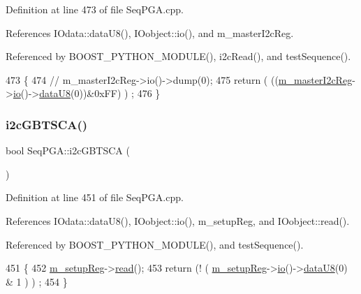 Definition at line 473 of file Seq\+P\+G\+A.\+cpp.



References I\+Odata\+::data\+U8(), I\+Oobject\+::io(), and m\+\_\+master\+I2c\+Reg.



Referenced by B\+O\+O\+S\+T\+\_\+\+P\+Y\+T\+H\+O\+N\+\_\+\+M\+O\+D\+U\+L\+E(), i2c\+Read(), and test\+Sequence().


\begin{DoxyCode}
473                                  \{
474   \textcolor{comment}{//  m\_masterI2cReg->io()->dump(0);}
475   \textcolor{keywordflow}{return} ( ((\hyperlink{classSeqPGA_a942c71b33a4f43b7a994cb9216abb17e}{m\_masterI2cReg}->\hyperlink{classIOobject_af04fb94137c3d86849f478ac5afab5d1}{io}()->\hyperlink{classIOdata_a75e9c318dbac3a39402179070943d4bc}{dataU8}(0))&0xFF) ) ;
476 \}
\end{DoxyCode}
\mbox{\label{classSeqPGA_a1d9edf6e3303581efe0bdb1b8b3fff0c}} 
\subsubsection{\texorpdfstring{i2c\+G\+B\+T\+S\+C\+A()}{i2cGBTSCA()}}
{\footnotesize\ttfamily bool Seq\+P\+G\+A\+::i2c\+G\+B\+T\+S\+CA (\begin{DoxyParamCaption}{ }\end{DoxyParamCaption})}



Definition at line 451 of file Seq\+P\+G\+A.\+cpp.



References I\+Odata\+::data\+U8(), I\+Oobject\+::io(), m\+\_\+setup\+Reg, and I\+Oobject\+::read().



Referenced by B\+O\+O\+S\+T\+\_\+\+P\+Y\+T\+H\+O\+N\+\_\+\+M\+O\+D\+U\+L\+E(), and test\+Sequence().


\begin{DoxyCode}
451                        \{
452   \hyperlink{classSeqPGA_a03269241e7fc26493cd0595beda334c2}{m\_setupReg}->\hyperlink{classIOobject_aa07610c11963b1db6710e3c76ceea456}{read}();
453   \textcolor{keywordflow}{return} (! ( \hyperlink{classSeqPGA_a03269241e7fc26493cd0595beda334c2}{m\_setupReg}->\hyperlink{classIOobject_af04fb94137c3d86849f478ac5afab5d1}{io}()->\hyperlink{classIOdata_a75e9c318dbac3a39402179070943d4bc}{dataU8}(0) & 1 ) ) ;
454 \}
\end{DoxyCode}
\mbox{\label{classSeqPGA_a7cd344df2be99f3a02b487f80e87b27e}} 
